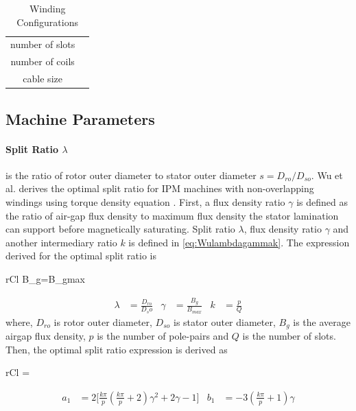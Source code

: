 \documentclass [a4 paper, 11pt, titlepage] {article}
\begin{document}
	\begin{table}[h]
		\begin{center}
			\begin{tabular}{c|c}
				 &  \\
				\hline
				number of slots & \\
				number of coils & \\
				cable size & 
			\end{tabular}
		\end{center}
		\caption{Winding Configurations}
		\label{tab:windingConfigurations}
	\end{table}
	
	
	
	
	
	\subsection{Machine Parameters}
		
	\paragraph{Split Ratio $\lambda$} is the ratio of rotor outer diameter to stator outer diameter $s=D_{ro}/D_{so}$. Wu et al. derives the optimal split ratio for IPM machines with non-overlapping windings using torque density equation \cite{wu_optimal_2010}. First, a flux density ratio $\gamma$ is defined as the ratio of air-gap flux density to maximum flux density the stator lamination can support before magnetically saturating. Split ratio $\lambda$, flux density ratio $\gamma$ and another intermediary ratio $k$ is defined in \ref{eq:Wulambdagammak}. The expression derived for the optimal split ratio is
	
	\begin{IEEEeqnarray*}{rCl}
		B_g=B_{gmax}
	\end{IEEEeqnarray*}
	\begin{align}
		\lambda&=\frac{D_{ro}}{D_so} & \gamma&=\frac{B_g}{B_{max}} & k&=\frac{p}{Q}
		\label{eq:Wulambdagammak}
	\end{align}
	where, $D_{ro}$ is rotor outer diameter, $D_{so}$ is stator outer diameter, $B_g$ is the average airgap flux density, $p$ is the number of pole-pairs and $Q$ is the number of slots. Then, the optimal split ratio expression is derived as
	\begin{IEEEeqnarray*}{rCl}
		\lambda=
	\end{IEEEeqnarray*}
	\begin{align*}
		a_1&=2\big[\frac{k\pi}{p}(\frac{k\pi}{p}+2)\gamma^2+2\gamma-1\big] & b_1&=-3(\frac{k\pi}{p}+1)\gamma
	\end{align*}
		
\end{document}
